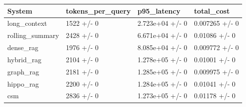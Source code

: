 \begin{tabular}{llll}
System & tokens_per_query & p95_latency & total_cost \\
\hline
long\_context & 1522 +/- 0 & 2.723e+04 +/- 0 & 0.007265 +/- 0 \\
rolling\_summary & 2428 +/- 0 & 6.671e+04 +/- 0 & 0.01086 +/- 0 \\
dense\_rag & 1976 +/- 0 & 8.085e+04 +/- 0 & 0.009772 +/- 0 \\
hybrid\_rag & 2104 +/- 0 & 1.278e+05 +/- 0 & 0.01001 +/- 0 \\
graph\_rag & 2181 +/- 0 & 1.285e+05 +/- 0 & 0.009975 +/- 0 \\
hippo\_rag & 2200 +/- 0 & 1.284e+05 +/- 0 & 0.01041 +/- 0 \\
csm & 2836 +/- 0 & 1.273e+05 +/- 0 & 0.01178 +/- 0 \\
\end{tabular}
